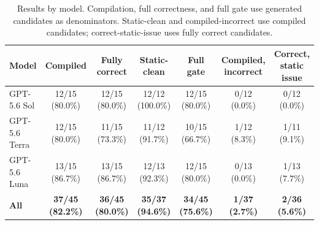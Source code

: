 \begin{table}[t]
\caption{Results by model. Compilation, full correctness, and full gate use generated candidates as denominators. Static-clean and compiled-incorrect use compiled candidates; correct-static-issue uses fully correct candidates.}
\label{tab:results}
\centering
\small
\begin{tabular}{lcccccc}
\hline
\textbf{Model} & \textbf{Compiled} & \textbf{Fully correct} & \textbf{Static-clean} & \textbf{Full gate} & \textbf{Compiled, incorrect} & \textbf{Correct, static issue} \\
\hline
GPT-5.6 Sol & 12/15 (80.0\%) & 12/15 (80.0\%) & 12/12 (100.0\%) & 12/15 (80.0\%) & 0/12 (0.0\%) & 0/12 (0.0\%) \\
GPT-5.6 Terra & 12/15 (80.0\%) & 11/15 (73.3\%) & 11/12 (91.7\%) & 10/15 (66.7\%) & 1/12 (8.3\%) & 1/11 (9.1\%) \\
GPT-5.6 Luna & 13/15 (86.7\%) & 13/15 (86.7\%) & 12/13 (92.3\%) & 12/15 (80.0\%) & 0/13 (0.0\%) & 1/13 (7.7\%) \\
\hline
\textbf{All} & \textbf{37/45 (82.2\%)} & \textbf{36/45 (80.0\%)} & \textbf{35/37 (94.6\%)} & \textbf{34/45 (75.6\%)} & \textbf{1/37 (2.7\%)} & \textbf{2/36 (5.6\%)} \\
\hline
\end{tabular}
\end{table}
